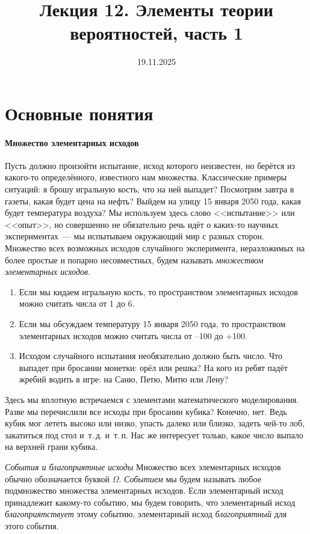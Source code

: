 \documentclass[11pt]{article}
\title{Лекция 12. Элементы теории вероятностей, часть 1}
\date{19.11.2025}
\begin{document}
\section{Основные понятия}
\paragraph{Множество элементарных исходов} Пусть должно произойти испытание, исход которого неизвестен, но берётся из какого-то определённого, известного нам множества. Классические примеры ситуаций: я брошу игральную кость, что на ней выпадет? Посмотрим завтра в газеты, какая будет цена на нефть? Выйдем на улицу 15 января 2050 года, какая будет температура воздуха? Мы используем здесь слово <<испытание>> или <<опыт>>, но совершенно не обязательно речь идёт о каких-то научных экспериментах~--- мы испытываем окружающий мир с разных сторон. Множество всех возможных исходов случайного эксперимента, неразложимых на более простые и попарно несовместных, будем называть \emph{множеством элементарных исходов}.

\begin{examples}
\item[]
\begin{enumerate}
	\item Если мы кидаем игральную кость, то пространством элементарных исходов можно считать числа от 1 до 6.

	\item Если мы обсуждаем температуру 15 января 2050 года, то пространством элементарных исходов можно считать числа от --100 до +100.

	\item Исходом случайного испытания необязательно должно быть число. Что выпадет при бросании монетки: орёл или решка? На кого из ребят падёт жребий водить в игре: на Саню, Петю, Митю или Лену?
\end{enumerate}
\end{examples}

Здесь мы вплотную встречаемся с элементами математического моделирования. Разве мы перечислили все исходы при бросании кубика? Конечно, нет. Ведь кубик мог лететь высоко или низко, упасть далеко или близко, задеть чей-то лоб, закатиться под стол и~т.\,д. и~т.\,п. Нас же интересует только, какое число выпало на верхней грани кубика.

\emph{События и благоприятные исходы} Множество всех элементарных исходов обычно обозначается буквой $\Omega$. \emph{Событием} мы будем называть любое подмножество множества элементарных исходов. Если элементарный исход принадлежит какому-то событию, мы будем говорить, что элементарный исход \emph{благоприятствует} этому событию, элементарный исход \emph{благоприятный} для этого события.
\end{document}
